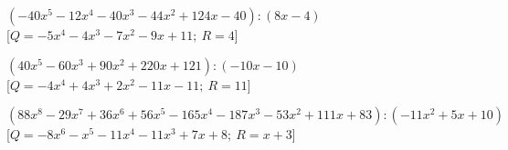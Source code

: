 \begin{esercizio}
\begin{enumeratea}
  \item  $\left(-40 x^5 -12 x^4 -40 x^3 -44 x^2 +124 x -40 \right) : 
          \left(8 x -4 \right)$ \\
   \hfill [$Q = -5 x^4 -4 x^3 -7 x^2 -9 x +11;~R = 4$]
  \item  $\left(40 x^5 -60 x^3 +90 x^2 +220 x +121 \right) : 
          \left(-10 x -10 \right)$ \\
   \hfill [$Q = -4 x^4 +4 x^3 +2 x^2 -11 x -11;~R = 11$]
  \item  $\left(88 x^8 -29 x^7 +36 x^6 +56 x^5 -165 x^4 -187 x^3 -53 x^2 +
                111 x +83 \right) : \left(-11 x^2 +5 x +10 \right)$ \\
   \hfill [$Q = -8 x^6 - x^5 -11 x^4 -11 x^3 +7 x +8;~R = x +3$]

\end{enumeratea}
\end{esercizio}
